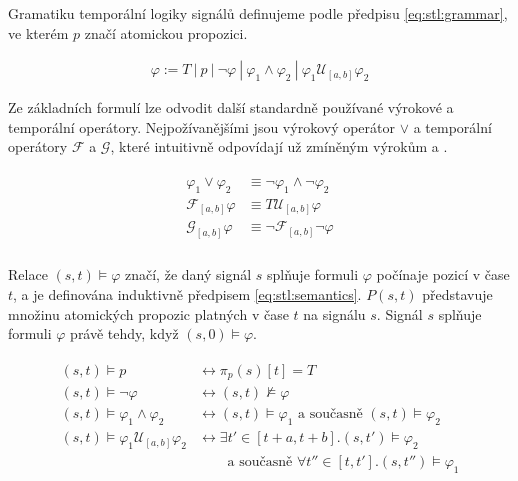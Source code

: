 Gramatiku temporální logiky signálů definujeme podle předpisu \ref{eq:stl:grammar},
ve kterém $p$ značí atomickou propozici.

\begin{align}\label{eq:stl:grammar}
\varphi := T~|~p~|~\neg\varphi~|~\varphi_1 \wedge \varphi_2~|~\varphi_1\mathcal{U}_{[a,b]}\varphi_2
\end{align}

Ze základních formulí lze odvodit další standardně používané výrokové a temporální operátory.
Nejpožívanějšími jsou výrokový operátor $\vee$ a temporální operátory $\mathcal{F}$ a $\mathcal{G}$,
které intuitivně odpovídají už zmíněným výrokům  a .

\begin{align}\label{eq:stl:other}
\begin{array}{ll}
\varphi_1\vee\varphi_2 		&\equiv \neg\varphi_1 \wedge \neg\varphi_2		\\
\mathcal{F}_{[a,b]}\varphi 	&\equiv T\mathcal{U}_{[a,b]}\varphi				\\
\mathcal{G}_{[a,b]}\varphi 	&\equiv \neg\mathcal{F}_{[a,b]}\neg\varphi		\\
\end{array}
\end{align}

Re\-la\-ce $(s, t) \models \varphi$ značí, že daný signál $s$ splňuje formuli $\varphi$
počínaje pozicí v čase $t$, a je definována induktivně předpisem \ref{eq:stl:semantics}.
$P(s, t)$ představuje množinu atomických propozic platných v čase $t$ na signálu $s$.
Signál $s$ splňuje formuli $\varphi$ právě tehdy, když $(s, 0) \models \varphi$.

\begin{align}\label{eq:stl:semantics}
\begin{array}{ll}
(s, t) \models p				&\longleftrightarrow \pi_p(s)[t] = T			\\
(s, t) \models \neg \varphi		&\longleftrightarrow (s, t) \not\models \varphi	\\
(s, t) \models \varphi_1 \wedge \varphi_2	&\longleftrightarrow (s, t) \models \varphi_1 \textrm{ a současně } (s, t) \models \varphi_2	\\
(s, t) \models \varphi_1 \mathcal{U}_{[a,b]} \varphi_2 	&\longleftrightarrow \exists t' \in [t+a, t+b] . (s, t') \models \varphi_2			\\														
&~~~~~~~~\textrm{ a současně } \forall t'' \in [t, t'] . (s, t'') \models \varphi_1
\end{array}
\end{align}

